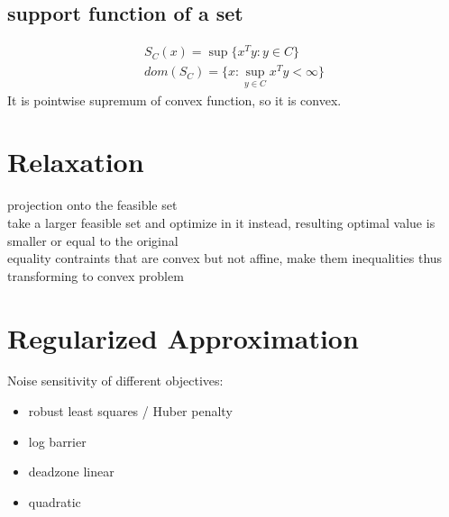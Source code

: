 \message{ !name(notebook.tex)}\documentclass[8pt]{report}
\newcommand{\norm}[1]{\|#1\|}
\newcommand{\set}[1]{\{#1\}}
\begin{document}
\begin{multicols*}{2}
    
  
  \subsection{support function of a set}
  \begin{align*}
    S_C(x) = \sup \set{x^T y : y \in C}\\
    dom(S_C) = \set{x: \sup_{y\in C} x^Ty < \infty}
  \end{align*}
  It is pointwise supremum of convex function, so it is convex.
  
  \vfill\null

  \pagebreak
  
  \section{Relaxation}

  projection onto the feasible set\\

  take a larger feasible set and optimize in it instead, resulting optimal value is smaller or equal to the original\\

  equality contraints that are convex but not affine, make them inequalities thus transforming to convex problem
  
  \vfill\null
  
  \pagebreak

  \section{Regularized Approximation}

  Noise sensitivity of different objectives:
  \begin{itemize}
  \item robust least squares / Huber penalty
  \item log barrier
  \item deadzone linear
  \item quadratic
  \end{itemize}


\end{multicols*}
\end{document}
